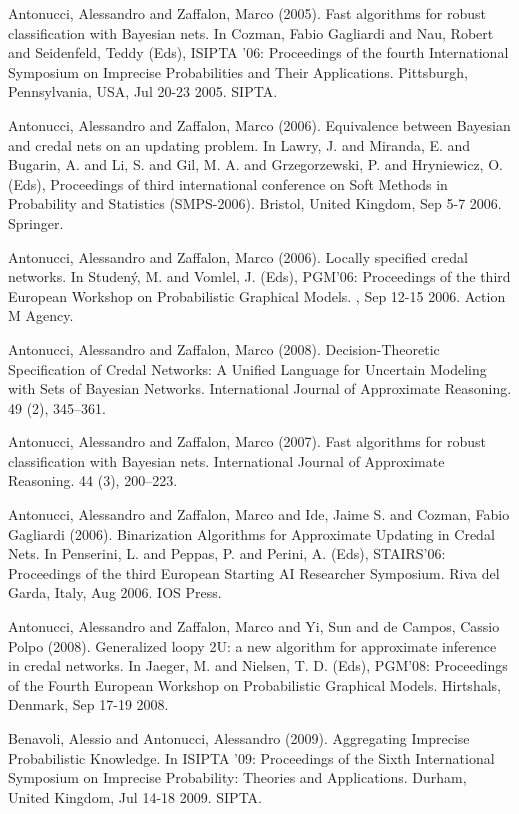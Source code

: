 \begin{cventries}
\begin{cvitems}
\item Antonucci, Alessandro and Zaffalon, Marco (2005).   Fast algorithms for robust classification with Bayesian nets.   In Cozman, Fabio Gagliardi and Nau, Robert and Seidenfeld, Teddy (Eds), ISIPTA ’06: Proceedings of the fourth International Symposium on Imprecise Probabilities and Their Applications.   Pittsburgh, Pennsylvania, USA,   Jul 20-23 2005.   SIPTA.
\item Antonucci, Alessandro and Zaffalon, Marco (2006).   Equivalence between Bayesian and credal nets on an updating problem.   In Lawry, J. and Miranda, E. and Bugarin, A. and Li, S. and Gil, M. A. and Grzegorzewski, P. and Hryniewicz, O. (Eds), Proceedings of third international conference on Soft Methods in Probability and Statistics (SMPS-2006).   Bristol, United Kingdom,   Sep 5-7 2006.   Springer.
\item Antonucci, Alessandro and Zaffalon, Marco (2006).   Locally specified credal networks.   In Studený, M. and Vomlel, J. (Eds), PGM’06: Proceedings of the third European Workshop on Probabilistic Graphical Models.   ,   Sep 12-15 2006.   Action M Agency.
\item Antonucci, Alessandro and Zaffalon, Marco (2008).   Decision-Theoretic Specification of Credal Networks: A Unified Language for Uncertain Modeling with Sets of Bayesian Networks.   International Journal of Approximate Reasoning. 49 (2), 345–361.
\item Antonucci, Alessandro and Zaffalon, Marco (2007).   Fast algorithms for robust classification with Bayesian nets.   International Journal of Approximate Reasoning. 44 (3), 200–223.
\item Antonucci, Alessandro and Zaffalon, Marco and Ide, Jaime S. and Cozman, Fabio Gagliardi (2006).   Binarization Algorithms for Approximate Updating in Credal Nets.   In Penserini, L. and Peppas, P. and Perini, A. (Eds), STAIRS’06: Proceedings of the third European Starting AI Researcher Symposium.   Riva del Garda, Italy,   Aug 2006.   IOS Press.
\item Antonucci, Alessandro and Zaffalon, Marco and Yi, Sun and de Campos, Cassio Polpo (2008).   Generalized loopy 2U: a new algorithm for approximate inference in credal networks.   In Jaeger, M. and Nielsen, T. D. (Eds), PGM’08: Proceedings of the Fourth European Workshop on Probabilistic Graphical Models.   Hirtshals, Denmark,   Sep 17-19 2008.
\item Benavoli, Alessio and Antonucci, Alessandro (2009).   Aggregating Imprecise Probabilistic Knowledge.   In ISIPTA ’09: Proceedings of the Sixth International Symposium on Imprecise Probability: Theories and Applications.   Durham, United Kingdom,   Jul 14-18 2009.   SIPTA.

\end{cvitems}
\end{cventries}
